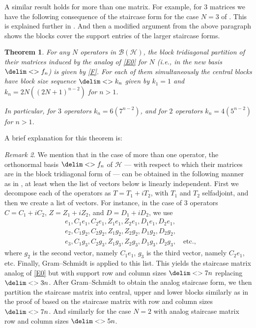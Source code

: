 \documentclass[10pt,reqno]{amsart}
\newtheorem{theorem}{Theorem}[section]
\theoremstyle{remark}
\newtheorem{remark}[theorem]{Remark}
\newcommand{\BH}{\mathcal{B}(\Hil)}
\newcommand{\Hil}{\mathcal{H}}
\newcommand{\seq}{\delim<>}
\numberwithin{equation}{section}
\begin{document}
A similar result holds for more than one matrix.
For example, for 3 matrices we have the following consequence of the staircase form for the case $N=3$ of .
This is explained further in .
And then a modified argument from the above paragraph shows the blocks cover the support entries of the larger staircase forms.

\begin{theorem}
  \label{t11}
  For any $N$ operators in $\BH$, the block tridiagonal partition of their matrices induced by the analog of \eqref{E0} for $N$ (i.e.,  in the new basis $\seq{f_n}$) is given by \eqref{F}.
  For each of them simultaneously the central blocks have block size sequence $\seq{k_n}$ given by $k_1 = 1$ and $k_n = 2N((2N+1)^{n-2})$ for $n > 1$.

  In particular, for $3$ operators $k_n = 6(7^{n-2})$, and for $2$ operators $k_n = 4(5^{n-2})$ for $n > 1$.
\end{theorem}

A brief explanation for this theorem is:

\begin{remark}
  \label{rem1}
  We mention that in the case of more than one operator, the orthonormal basis $\seq{f_n}$ of $\Hil$ --- with respect to which their matrices are in the block tridiagonal form of  --- can be obtained in the following manner as in \cite[Theorem 2--Corollary 3, combined]{Wei-1980-IEOT}, at least when the list of vectors below is linearly independent.
  First we decompose each of the operators as $T=T_1+iT_2$, with $T_1$ and $T_2$ selfadjoint, and then we create a list of vectors.
  For instance, in the case of 3 operators $C=C_1+iC_2$, $Z=Z_1+iZ_2$, and $D=D_1+iD_2$, we use
  \begin{align*}
    &e_1, C_1e_1, C_2 e_1, Z_1e_1, Z_2e_1, D_1e_1,D_2e_1,\\
    &e_2, C_1 g_2, C_2g_2, Z_1g_2, Z_2g_2, D_1g_2,D_2g_2,\\
    &e_3, C_1 g_3, C_2g_3, Z_1g_3, Z_2g_3, D_1g_3,D_2g_3,\quad \mbox{etc.},
  \end{align*}
  where $g_2$ is the second vector, namely $C_1e_1$, $g_3$ is the third vector, namely $C_2e_1$, etc.
  Finally, Gram--Schmidt is applied to this list.
  This yields the staircase matrix analog of \eqref{E0} but with support row and column sizes $\seq{7n}$ replacing $\seq{3n}$.
  After Gram--Schmidt to obtain the analog staircase form, we then partition the staircase matrix into central, upper and lower blocks similarly as in the proof of  based on the staircase matrix with row and column sizes $\seq{7n}$.
  And similarly for the case $N=2$ with analog staircase matrix row and column sizes $\seq{5n}$.
\end{remark}
\end{document}
